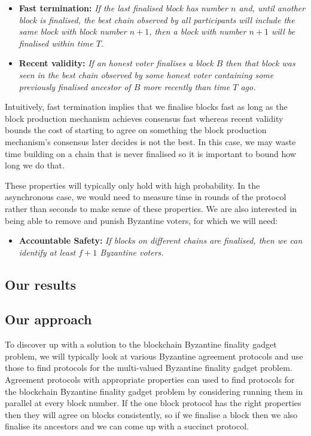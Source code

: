\documentclass{article}
\begin{document}
\begin{itemize}
\item{\bf Fast termination:} {\em If the last finalised block has number $n$ and, until another block is finalised, the best chain observed by all participants will include the same block with block number $n+1$, then a block with number $n+1$ will be finalised within time $T$.}
\item{\bf Recent validity:} {\em If an honest voter finalises a block $B$ then that block was seen in the best chain observed by some honest voter containing some previously finalised ancestor of $B$ more recently than time $T$ ago.}
\end{itemize}

Intuitively, fast termination implies that we finalise blocks fast as long as the block production mechanism achieves consensus fast whereas recent validity bounds the cost of starting to agree on something the block production mechanism's consensus later decides is not the best. In this case, we may waste time building on a chain that is never finalised so it is important to bound how long we do that.

These properties will typically only hold with high probability. In the asynchronous case, we would need to measure time in rounds of the protocol rather than seconds to make sense of these properties.  We are also interested in being able to remove and punish Byzantine voters, for which we will need:

\begin{itemize}
	\item{\bf Accountable Safety:} {\em If blocks on different chains are finalised, then we can identify at least $f+1$ Byzantine voters.}
\end{itemize}

\subsection{Our results}

\subsection{Our approach}

To discover up with a solution to the blockchain Byzantine finality gadget problem, we will typically look at various Byzantine agreement protocols and use those to find protocols for the multi-valued Byzantine finality gadget problem. 
Agreement protocols with appropriate properties can used to find protocols for the blockchain Byzantine finality gadget problem by considering running them in parallel at every block number.
If the one block protocol has the right properties then they will agree on blocks consistently, so if we finalise a block then we also finalise its ancestors and we can come up with a succinct protocol.
\end{document}
